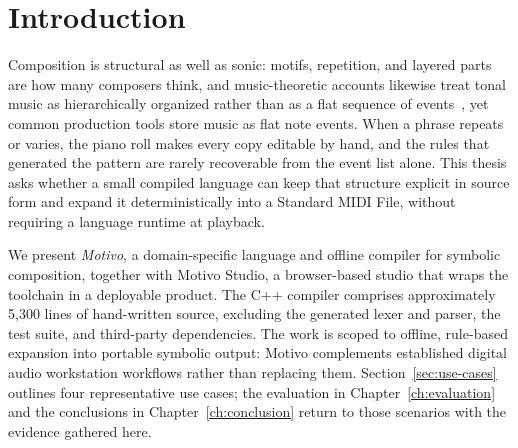 \chapter{Introduction}\label{ch:introduction}

Composition is structural as well as sonic: motifs, repetition, and layered parts are how many composers think,
and music-theoretic accounts likewise treat tonal music as hierarchically organized rather than as a flat sequence of
events~\cite{Lerdahl_Jackendoff_1983}, yet common production tools store music as flat note events.
When a phrase repeats or varies, the piano roll makes every copy editable by hand, and the rules that generated the
pattern are rarely recoverable from the event list alone.
This thesis asks whether a small compiled language can keep that structure explicit in source form and expand it
deterministically into a Standard MIDI File, without requiring a language runtime at playback.

We present \textit{Motivo}, a domain-specific language and offline compiler for symbolic composition, together with
Motivo Studio, a browser-based studio that wraps the toolchain in a deployable product.
The C++ compiler comprises approximately 5{,}300 lines of hand-written source, excluding the generated lexer and parser,
the test suite, and third-party dependencies.
The work is scoped to offline, rule-based expansion into portable symbolic output: Motivo complements established
digital audio workstation workflows rather than replacing them.
Section~\ref{sec:use-cases} outlines four representative use cases; the evaluation in Chapter~\ref{ch:evaluation} and
the conclusions in Chapter~\ref{ch:conclusion} return to those scenarios with the evidence gathered here.







